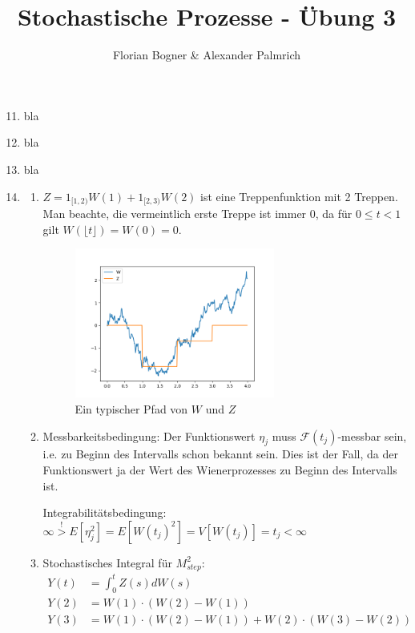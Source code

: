 \documentclass[a4paper,11pt,notitlepage,fullpage]{article}
\begin{document}
\author{Florian Bogner \& Alexander Palmrich}
\title{Stochastische Prozesse - Übung 3}
\maketitle

\begin{enumerate}
\setcounter{enumi}{10}

\item bla

\item bla

\item bla

\item
\begin{enumerate}
\item $Z = 1_{[1, 2)} W(1) + 1_{[2, 3)} W(2)$ ist eine Treppenfunktion mit 2 Treppen. Man beachte, die vermeintlich erste Treppe ist immer 0, da für $0 \leq t < 1$ gilt $W(\lfloor t\rfloor) = W(0) = 0$.
\begin{figure}[h!]
\centering
\includegraphics[width=0.66\textwidth]{gfx/14_fig.png}
\caption{Ein typischer Pfad von $W$ und $Z$}
\end{figure}

\item Messbarkeitsbedingung: Der Funktionswert $\eta_j$ muss $\mathcal F(t_j)$-messbar sein, i.e. zu Beginn des Intervalls schon bekannt sein. Dies ist der Fall, da der Funktionswert ja der Wert des Wienerprozesses zu Beginn des Intervalls ist.

Integrabilitätsbedingung: $\infty \stackrel{!}{>} E[\eta_j^2] = E[W(t_j)^2] = V[W(t_j)] = t_j < \infty$

\item Stochastisches Integral für $M_{step}^2$:
\begin{align*}
Y(t) &= \int_0^t Z(s)dW(s) \\
Y(2) &= W(1) \cdot (W(2) - W(1)) \\
Y(3) &= W(1) \cdot (W(2) - W(1)) + W(2) \cdot (W(3) - W(2))
\end{align*}


\end{enumerate}
\end{enumerate}
\end{document}

